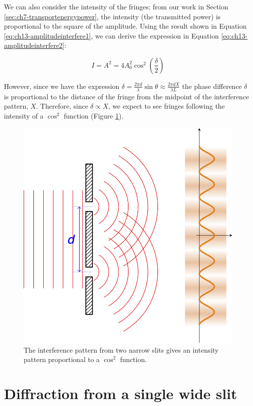 \documentclass[
]{book}
\begin{document}
We can also consider the intensity of the fringes; from our work in Section \ref{sec:ch7-transportenergypower}, the intensity (the transmitted power) is proportional to the square of the amplitude. Using the result shown in Equation \eqref{eq:ch13-amplitudeinterfere1}, we can derive the expression in Equation \eqref{eq:ch13-amplitudeinterfere2}:

\begin{equation}
I = A^2 = 4 A_0^2 \cos^2 \left(\frac{\delta}{2}\right)
\label{eq:ch13-amplitudeinterfere2}
\end{equation}

However, since we have the expression \(\delta = \frac{2\pi d}{\lambda}\sin\theta \approx \frac{2\pi d X}{\lambda L}\) the phase difference \(\delta\) is proportional to the distance of the fringe from the midpoint of the interference pattern, \(X\). Therefore, since \(\delta \propto X\), we expect to see fringes following the intensity of a \(\cos^2\) function (Figure \ref{fig:ch13-cos2fringes}).

\begin{figure}

{\centering \includegraphics[width=0.7\linewidth]{visualisations/LaTeX/ch13-cos2-interference} 

}

\caption{The interference pattern from two narrow slits gives an intensity pattern proportional to a $\cos^2$ function.}\label{fig:ch13-cos2fringes}
\end{figure}

\hypertarget{sec:ch13-singlewideslit}{%
\section{Diffraction from a single wide slit}\label{sec:ch13-singlewideslit}}
\end{document}
